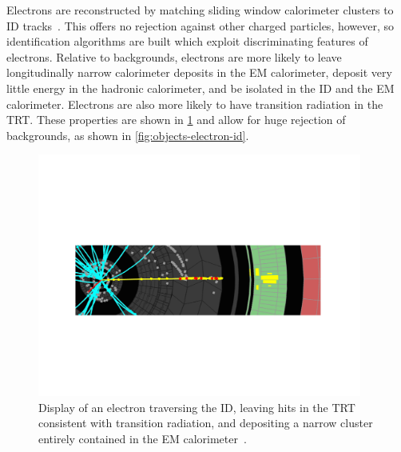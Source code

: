 Electrons are reconstructed by matching sliding window calorimeter clusters to ID tracks~\cite{ATLAS-CONF-2014-032}. This offers no rejection against other charged particles, however, so identification algorithms are built which exploit discriminating features of electrons. Relative to backgrounds, electrons are more likely to leave longitudinally narrow calorimeter deposits in the EM calorimeter, deposit very little energy in the hadronic calorimeter, and be isolated in the ID and the EM calorimeter. Electrons are also more likely to have transition radiation in the TRT. These properties are shown in \cref{fig:objects-electron-display} and allow for huge rejection of backgrounds, as shown in \cref{fig:objects-electron-id}.

\begin{figure}[tp]
  \centering
  \includegraphics[width=0.95\textwidth]{figures/performance/electron-display}
  \caption{Display of an electron traversing the ID, leaving hits in the TRT consistent with transition radiation, and depositing a narrow cluster entirely contained in the EM calorimeter~\cite{atlas-eventdisplays}.}
  \label{fig:objects-electron-display}
\end{figure}

